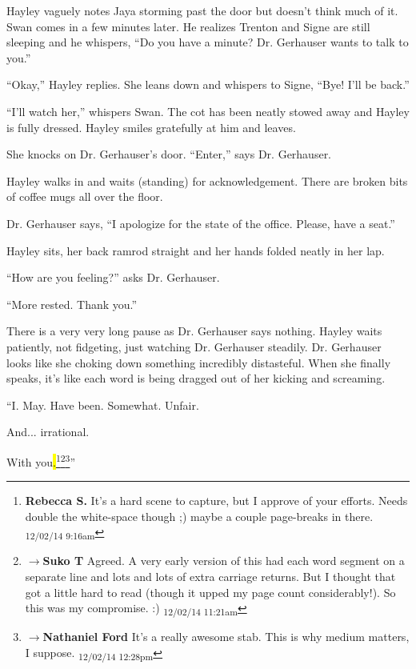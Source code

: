 Hayley vaguely notes Jaya storming past the door but doesn't think much of it.  Swan comes in a few minutes later.  He realizes Trenton and Signe are still sleeping and he whispers, ``Do you have a minute?  Dr. Gerhauser wants to talk to you.''

``Okay,'' Hayley replies.  She leans down and whispers to Signe, ``Bye!  I'll be back.''

``I'll watch her,'' whispers Swan.  The cot has been neatly stowed away and Hayley is fully dressed.  Hayley smiles gratefully at him and leaves.



She knocks on Dr. Gerhauser's door. ``Enter,'' says Dr. Gerhauser.

Hayley walks in and waits (standing) for acknowledgement.  There are broken bits of coffee mugs all over the floor.

Dr. Gerhauser says, ``I apologize for the state of the office.  Please, have a seat.''

Hayley sits, her back ramrod straight and her hands folded neatly in her lap. 

``How are you feeling?'' asks Dr. Gerhauser.

``More rested.  Thank you.''

There is a very very long pause as Dr. Gerhauser says nothing.   Hayley waits patiently, not fidgeting, just watching Dr. Gerhauser steadily.  Dr. Gerhauser looks like she choking down something incredibly distasteful.  When she finally speaks, it's like each word is being dragged out of her kicking and screaming.  

``I.         May.             Have been.        Somewhat.                                Unfair.

                        And... irrational.  

                                                                                             With you\hl{.}\footnote{\textbf{Rebecca S. }It's a hard scene to capture, but I approve of your efforts.  Needs double the white-space though ;) maybe a couple page-breaks in there. \textsubscript{12/02/14 9:16am}}\footnote{$\rightarrow$\textbf{Suko T }Agreed.  A very early version of this had each word segment on a separate line and lots and lots of extra carriage returns.  But I thought that got a little hard to read (though it upped my page count considerably!).  So this was my compromise. :) \textsubscript{12/02/14 11:21am}}\footnote{$\rightarrow$\textbf{Nathaniel Ford }It's a really awesome stab. This is why medium matters, I suppose. \textsubscript{12/02/14 12:28pm}}''

